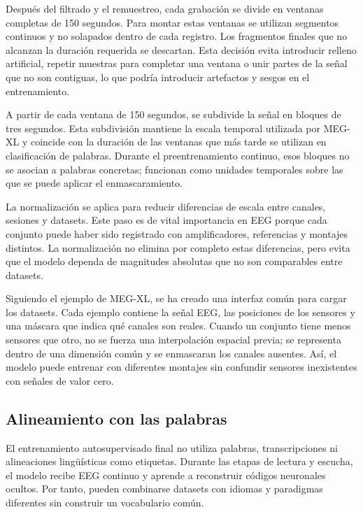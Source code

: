 Después del filtrado y el remuestreo, cada grabación se divide en ventanas completas de 150 segundos. Para montar estas ventanas se utilizan segmentos continuos y no solapados dentro de cada registro. Los fragmentos finales que no alcanzan la duración requerida se descartan. Esta decisión evita introducir relleno artificial, repetir muestras para completar una ventana o unir partes de la señal que no son contiguas, lo que podría introducir artefactos y sesgos en el entrenamiento.

A partir de cada ventana de 150 segundos, se subdivide la señal en bloques de tres segundos. Esta subdivisión mantiene la escala temporal utilizada por MEG-XL y coincide con la duración de las ventanas que más tarde se utilizan en clasificación de palabras. Durante el preentrenamiento continuo, esos bloques no se asocian a palabras concretas; funcionan como unidades temporales sobre las que se puede aplicar el enmascaramiento.

La normalización se aplica para reducir diferencias de escala entre canales, sesiones y datasets. Este paso es de vital importancia en EEG porque cada conjunto puede haber sido registrado con amplificadores, referencias y montajes distintos. La normalización no elimina por completo estas diferencias, pero evita que el modelo dependa de magnitudes absolutas que no son comparables entre datasets.

Siguiendo el ejemplo de MEG-XL, se ha creado una interfaz común para cargar los datasets. Cada ejemplo contiene la señal EEG, las posiciones de los sensores y una máscara que indica qué canales son reales. Cuando un conjunto tiene menos sensores que otro, no se fuerza una interpolación espacial previa; se representa dentro de una dimensión común y se enmascaran los canales ausentes. Así, el modelo puede entrenar con diferentes montajes sin confundir sensores inexistentes con señales de valor cero.

\subsection{Alineamiento con las palabras}

El entrenamiento autosupervisado final no utiliza palabras, transcripciones ni alineaciones lingüísticas como etiquetas. Durante las etapas de lectura y escucha, el modelo recibe EEG continuo y aprende a reconstruir códigos neuronales ocultos. Por tanto, pueden combinarse datasets con idiomas y paradigmas diferentes sin construir un vocabulario común.


